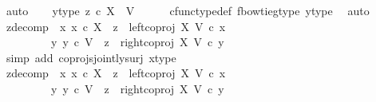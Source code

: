 \begin{isabellebody}
\ auto\isanewline
\ \ \isamarkupfalse%
\ y{\isacharunderscore}{\kern0pt}type{}{\isacharcolon}{\kern0pt}\ {\isachardoublequoteopen}z{}\ {\isasymin}\isactrlsub c\ X\ {\isasymCoprod}\ V{\isachardoublequoteclose}\isanewline
\ \ \ \ \isamarkupfalse%
\ cfunc{\isacharunderscore}{\kern0pt}type{\isacharunderscore}{\kern0pt}def\ f{\isacharunderscore}{\kern0pt}bowtie{\isacharunderscore}{\kern0pt}g{\isacharunderscore}{\kern0pt}type\ y{\isacharunderscore}{\kern0pt}type\ \isamarkupfalse%
\ auto\isanewline
\isanewline
\ \ \isamarkupfalse%
\ z{}{\isacharunderscore}{\kern0pt}decomp{\isacharcolon}{\kern0pt}\ {\isachardoublequoteopen}{\isacharparenleft}{\kern0pt}{\isasymexists}\ x{}{\isachardot}{\kern0pt}\ {\isacharparenleft}{\kern0pt}x{}\ {\isasymin}\isactrlsub c\ X\ {\isasymand}\ z{}\ {\isacharequal}{\kern0pt}\ left{\isacharunderscore}{\kern0pt}coproj\ X\ V\ {\isasymcirc}\isactrlsub c\ x{}{\isacharparenright}{\kern0pt}{\isacharparenright}{\kern0pt}\isanewline
\ \ \ \ \ \ {\isasymor}\ \ {\isacharparenleft}{\kern0pt}{\isasymexists}\ y{}{\isachardot}{\kern0pt}\ {\isacharparenleft}{\kern0pt}y{}\ {\isasymin}\isactrlsub c\ V\ {\isasymand}\ z{}\ {\isacharequal}{\kern0pt}\ right{\isacharunderscore}{\kern0pt}coproj\ X\ V\ {\isasymcirc}\isactrlsub c\ y{}{\isacharparenright}{\kern0pt}{\isacharparenright}{\kern0pt}{\isachardoublequoteclose}\isanewline
\ \ \ \ \isamarkupfalse%
\ {\isacharparenleft}{\kern0pt}simp\ add{\isacharcolon}{\kern0pt}\ coprojs{\isacharunderscore}{\kern0pt}jointly{\isacharunderscore}{\kern0pt}surj\ x{\isacharunderscore}{\kern0pt}type{}{\isacharparenright}{\kern0pt}\isanewline
\isanewline
\ \ \isamarkupfalse%
\ z{}{\isacharunderscore}{\kern0pt}decomp{\isacharcolon}{\kern0pt}\ {\isachardoublequoteopen}{\isacharparenleft}{\kern0pt}{\isasymexists}\ x{}{\isachardot}{\kern0pt}\ {\isacharparenleft}{\kern0pt}x{}\ {\isasymin}\isactrlsub c\ X\ {\isasymand}\ z{}\ {\isacharequal}{\kern0pt}\ left{\isacharunderscore}{\kern0pt}coproj\ X\ V\ {\isasymcirc}\isactrlsub c\ x{}{\isacharparenright}{\kern0pt}{\isacharparenright}{\kern0pt}\isanewline
\ \ \ \ \ \ {\isasymor}\ \ {\isacharparenleft}{\kern0pt}{\isasymexists}\ y{}{\isachardot}{\kern0pt}\ {\isacharparenleft}{\kern0pt}y{}\ {\isasymin}\isactrlsub c\ V\ {\isasymand}\ z{}\ {\isacharequal}{\kern0pt}\ right{\isacharunderscore}{\kern0pt}coproj\ X\ V\ {\isasymcirc}\isactrlsub c\ y{}{\isacharparenright}{\kern0pt}{\isacharparenright}{\kern0pt}{\isachardoublequoteclose}\isanewline

\end{isabellebody}
